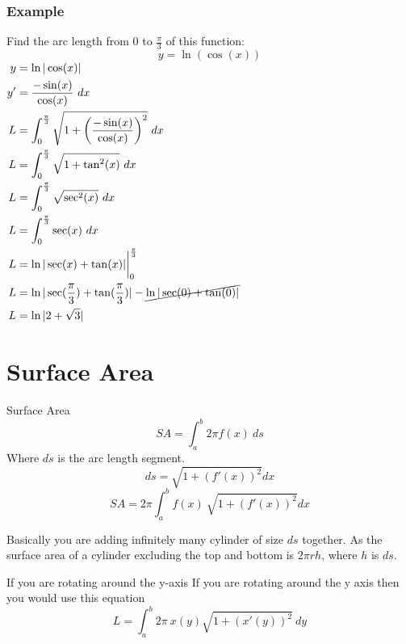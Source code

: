 \documentclass[letterpaper,10pt,twoside,twocolumn,openany]{book}
\begin{document}
\subsubsection{Example}
Find the arc length from 0 to $\frac{\pi}{3}$ of this function:\\
$$
    y = \ln(\cos(x))
$$
\newpage
$\begin{aligned}
    y &= \ln|\cos(x)|\\
    y' &= \frac{-\sin(x)}{\cos(x)}\ dx\\ 
    L &= \int_0^{\frac{\pi}{3}} \sqrt{1 + \biggl( \frac{-\sin(x)}{\cos(x)}\biggl)^2} \ dx\\ 
    L &= \int_0^{\frac{\pi}{3}} \sqrt{1 + \tan^2(x)} \ dx\\
    L &= \int_0^{\frac{\pi}{3}} \sqrt{\sec^2(x)} \ dx\\ 
    L &= \int_0^{\frac{\pi}{3}} \sec(x)\ dx\\
    L &= \ln|\sec(x) + \tan(x)|\biggl|_0^{\frac{\pi}{3}}\\ 
    L &= \ln|\sec(\frac{\pi}{3}) + \tan(\frac{\pi}{3})| - \cancel{\ln|\sec(0) + \tan(0)|}\\ 
    L &= \ln|2 + \sqrt{3}|
\end{aligned}$


\section{Surface Area}
\begin{DndSidebar}{Surface Area}
    \begin{equation}
        SA = \int_a^b 2\pi f(x)\ ds
    \end{equation}
    Where $ds$ is the arc length segment.
    \begin{equation*}
        ds = \sqrt{1 + (f'(x))^2}dx
    \end{equation*}
    \begin{equation}
        SA = 2\pi \int_a^b f(x)\ \sqrt{1 + (f'(x))^2}dx
    \end{equation}
\end{DndSidebar}
Basically you are adding infinitely many cylinder of size $ds$ together. As the surface area of a cylinder excluding the top and bottom is $2\pi r h $, where $h$ is $ds$.\\
\begin{DndComment}{If you are rotating around the y-axis}   
    If you are rotating around the y axis then you would use this equation
    \begin{equation} 
        L = \int_a^b 2\pi\ x(y) \sqrt{1 + (x'(y))^2}\ dy
    \end{equation}
\end{DndComment}
\newpage
\end{document}
